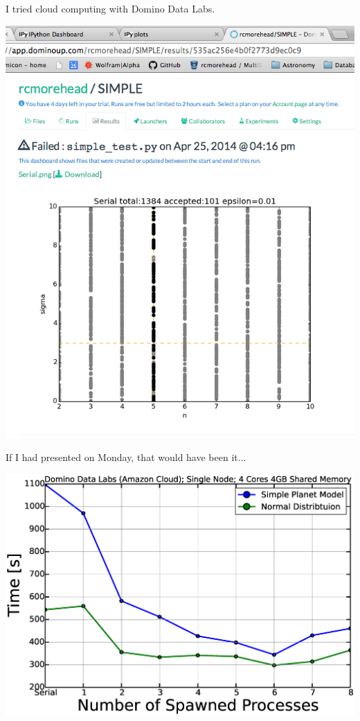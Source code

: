 \documentclass{beamer}
\begin{document}
\begin{frame}{I tried cloud computing with Domino Data Labs.}
\begin{center}
\includegraphics[scale=.27]{domino.png}
\end{center}
\end{frame}

\begin{frame}{If I had presented on Monday, that would have been it...}
\begin{center}
\includegraphics[scale=.3]{time-c.eps}
\end{center}
\end{frame}
\end{document}
